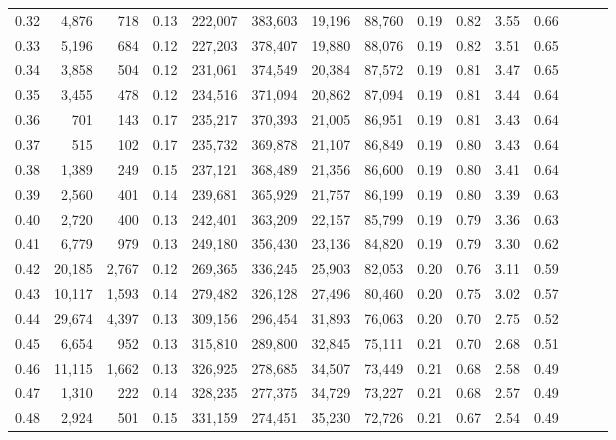 \begin{tabular}{rrrrrrrrrrrrrrr}
0.32 &   4,876 &    718 &  0.13 &  222,007 &  383,603 &   19,196 &   88,760 &  0.19 &  0.82 &  3.55 &      0.66 \\
0.33 &   5,196 &    684 &  0.12 &  227,203 &  378,407 &   19,880 &   88,076 &  0.19 &  0.82 &  3.51 &      0.65 \\
0.34 &   3,858 &    504 &  0.12 &  231,061 &  374,549 &   20,384 &   87,572 &  0.19 &  0.81 &  3.47 &      0.65 \\
0.35 &   3,455 &    478 &  0.12 &  234,516 &  371,094 &   20,862 &   87,094 &  0.19 &  0.81 &  3.44 &      0.64 \\
0.36 &     701 &    143 &  0.17 &  235,217 &  370,393 &   21,005 &   86,951 &  0.19 &  0.81 &  3.43 &      0.64 \\
0.37 &     515 &    102 &  0.17 &  235,732 &  369,878 &   21,107 &   86,849 &  0.19 &  0.80 &  3.43 &      0.64 \\
0.38 &   1,389 &    249 &  0.15 &  237,121 &  368,489 &   21,356 &   86,600 &  0.19 &  0.80 &  3.41 &      0.64 \\
0.39 &   2,560 &    401 &  0.14 &  239,681 &  365,929 &   21,757 &   86,199 &  0.19 &  0.80 &  3.39 &      0.63 \\
0.40 &   2,720 &    400 &  0.13 &  242,401 &  363,209 &   22,157 &   85,799 &  0.19 &  0.79 &  3.36 &      0.63 \\
0.41 &   6,779 &    979 &  0.13 &  249,180 &  356,430 &   23,136 &   84,820 &  0.19 &  0.79 &  3.30 &      0.62 \\
0.42 &  20,185 &  2,767 &  0.12 &  269,365 &  336,245 &   25,903 &   82,053 &  0.20 &  0.76 &  3.11 &      0.59 \\
0.43 &  10,117 &  1,593 &  0.14 &  279,482 &  326,128 &   27,496 &   80,460 &  0.20 &  0.75 &  3.02 &      0.57 \\
0.44 &  29,674 &  4,397 &  0.13 &  309,156 &  296,454 &   31,893 &   76,063 &  0.20 &  0.70 &  2.75 &      0.52 \\
0.45 &   6,654 &    952 &  0.13 &  315,810 &  289,800 &   32,845 &   75,111 &  0.21 &  0.70 &  2.68 &      0.51 \\
0.46 &  11,115 &  1,662 &  0.13 &  326,925 &  278,685 &   34,507 &   73,449 &  0.21 &  0.68 &  2.58 &      0.49 \\
0.47 &   1,310 &    222 &  0.14 &  328,235 &  277,375 &   34,729 &   73,227 &  0.21 &  0.68 &  2.57 &      0.49 \\
0.48 &   2,924 &    501 &  0.15 &  331,159 &  274,451 &   35,230 &   72,726 &  0.21 &  0.67 &  2.54 &      0.49 \\

\end{tabular}
